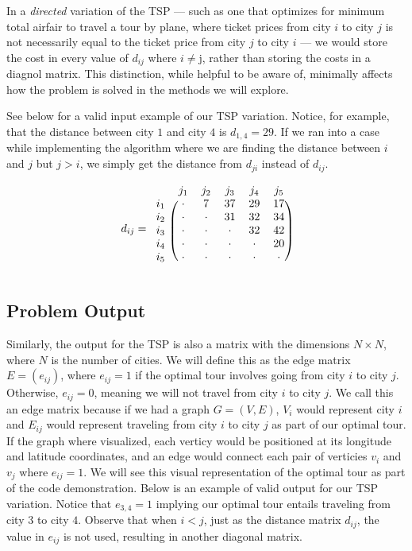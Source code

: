\documentclass[11pt,fleqn]{article}
\begin{document}
In a \textit{directed} variation of the TSP --- such as one that
optimizes for minimum total airfair to travel a tour by plane,
where ticket prices from city $i$ to city $j$ is not necessarily
equal to the ticket price from city $j$ to city $i$ --- we would
store the cost in every value of $d_{ij}$ where $i\neq $j, rather
than storing the costs in a diagnol matrix.  This distinction,
while helpful to be aware of, minimally affects how the problem is
solved in the methods we will explore.

\par

See below for a valid 
input example of our TSP variation.  Notice, for example, that the
distance between city $1$ and city $4$ is $d_{1,4}=29$.  If we ran
into a case while implementing the algorithm where we are finding
the distance between $i$ and $j$ but $j>i$, we simply get the distance
from $d_{ji}$ instead of $d_{ij}$.
\par

\begin{align*}
  d_{ij}=
  \begin{blockarray}{cccccc}
    & j_1 & j_2 & j_3 & j_4 & j_5 \\
  \begin{block}{c(ccccc)}
    i_1 & \cdot & 7 & 37 & 29 & 17 \\
    i_2 & \cdot & \cdot & 31 & 32 & 34 \\
    i_3 & \cdot & \cdot & \cdot & 32 & 42 \\
    i_4 & \cdot & \cdot & \cdot & \cdot & 20 \\
    i_5 & \cdot & \cdot & \cdot & \cdot & \cdot \\
  \end{block}
  \end{blockarray}
\end{align*}

\subsection{Problem Output}
Similarly, the output for the TSP is also a matrix with the dimensions
$N\times N$, where $N$ is the number of cities.  We will define this as
the edge matrix $E = (e_{ij})$, where $e_{ij}=1$ if the optimal tour involves
going from city $i$ to city $j$.  Otherwise, $e_{ij}=0$, meaning we will not
travel from city $i$ to city $j$.  We call this an edge matrix because if
we had a graph $G=(V,E)$, $V_i$ would represent city $i$ and $E_{ij}$ would
represent traveling from city $i$ to city $j$ as part of our optimal tour.
If the graph where visualized, each verticy would be positioned at its
longitude and latitude coordinates, and an edge would connect each pair of
verticies $v_i$ and $v_j$ where $e_{ij}=1$.  We will see this visual
representation of the optimal tour as part of the code demonstration.
Below is an example of valid output for our TSP variation.  Notice that
$e_{3,4}=1$ implying our optimal tour entails traveling from city $3$ to
city $4$.  Observe that when $i<j$, just as the distance matrix $d_{ij}$,
the value in $e_{ij}$ is not used, resulting in another diagonal matrix.
\par
\end{document}
